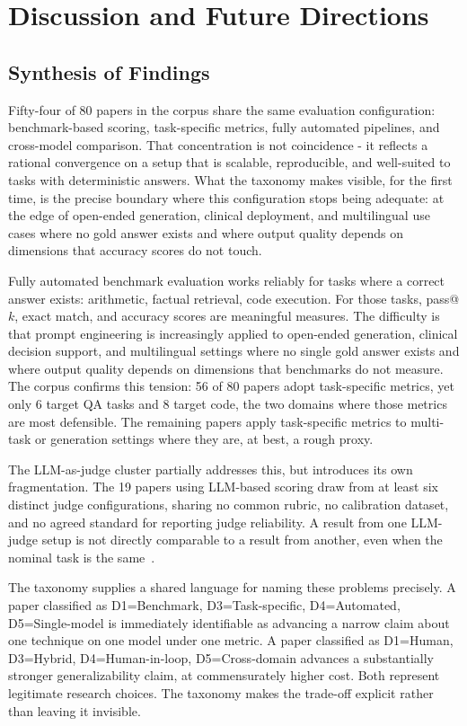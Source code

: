 \documentclass[journal]{IEEEtran}
\begin{document}
\section{Discussion and Future Directions}
\label{sec:discussion}

\subsection{Synthesis of Findings}

Fifty-four of 80 papers in the corpus share the same evaluation
configuration: benchmark-based scoring, task-specific metrics, fully
automated pipelines, and cross-model comparison. That concentration is
not coincidence - it reflects a rational convergence on a setup that
is scalable, reproducible, and well-suited to tasks with deterministic
answers. What the taxonomy makes visible, for the first time, is the
precise boundary where this configuration stops being adequate: at the
edge of open-ended generation, clinical deployment, and multilingual use
cases where no gold answer exists and where output quality depends on
dimensions that accuracy scores do not touch.

Fully automated benchmark evaluation works reliably for tasks where
a correct answer exists: arithmetic, factual retrieval, code execution.
For those tasks, pass@$k$, exact match, and accuracy scores are
meaningful measures. The difficulty is that prompt engineering is
increasingly applied to open-ended generation, clinical decision
support, and multilingual settings where no single gold answer exists
and where output quality depends on dimensions that benchmarks do not
measure. The corpus confirms this tension: 56 of 80 papers adopt
task-specific metrics, yet only 6 target QA tasks and 8 target code,
the two domains where those metrics are most defensible. The remaining
papers apply task-specific metrics to multi-task or generation settings
where they are, at best, a rough proxy.

The LLM-as-judge cluster partially addresses this, but introduces
its own fragmentation. The 19 papers using LLM-based scoring draw
from at least six distinct judge configurations, sharing no common
rubric, no calibration dataset, and no agreed standard for reporting
judge reliability. A result from one LLM-judge setup is not directly
comparable to a result from another, even when the nominal task
is the same~\cite{gu2025llmjudge, feng2025sage}.

The taxonomy supplies a shared language for naming these problems
precisely. A paper classified as D1=Benchmark, D3=Task-specific,
D4=Automated, D5=Single-model is immediately identifiable as advancing
a narrow claim about one technique on one model under one metric. A
paper classified as D1=Human, D3=Hybrid, D4=Human-in-loop,
D5=Cross-domain advances a substantially stronger generalizability
claim, at commensurately higher cost. Both represent legitimate
research choices. The taxonomy makes the trade-off explicit
rather than leaving it invisible.
\end{document}

